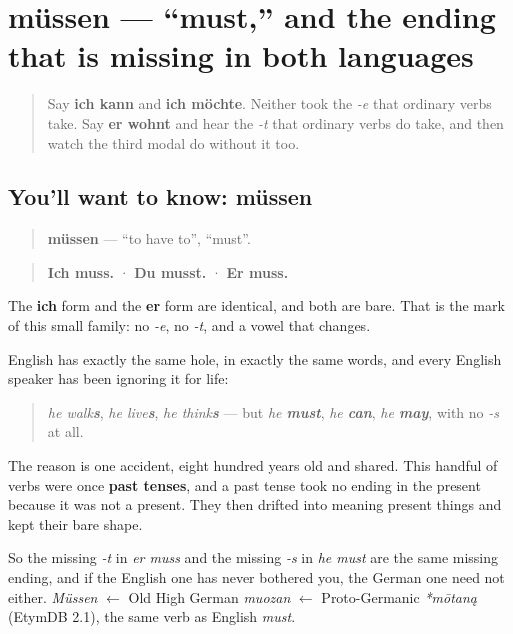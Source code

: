 \section[müssen]{müssen — \textquotedblleft{}must,\textquotedblright{} and the ending that is missing in both languages}

\label{lesson:GE-C38-muessen}



\begin{quote}
Say \textbf{ich kann} and \textbf{ich möchte}. Neither took the \emph{-e} that ordinary verbs take. Say \textbf{er wohnt} and hear the \emph{-t} that ordinary verbs do take, and then watch the third modal do without it too.
\end{quote}

\subsection*{You'll want to know: müssen}
\begin{quote}
\textbf{müssen} — \textquotedblleft{}to have to\textquotedblright{}, \textquotedblleft{}must\textquotedblright{}.
\end{quote}

\begin{quote}
\textbf{Ich muss.} · \textbf{Du musst.} · \textbf{Er muss.}
\end{quote}

The \textbf{ich} form and the \textbf{er} form are identical, and both are bare. That is the mark of this small family: no \emph{-e}, no \emph{-t}, and a vowel that changes.

\begin{cousinweb}
English has exactly the same hole, in exactly the same words, and every English speaker has been ignoring it for life:

\begin{quote}
\emph{he walk\textbf{s}}, \emph{he live\textbf{s}}, \emph{he think\textbf{s}} — but \emph{he \textbf{must}}, \emph{he \textbf{can}}, \emph{he \textbf{may}}, with no \emph{-s} at all.
\end{quote}

The reason is one accident, eight hundred years old and shared. This handful of verbs were once \textbf{past tenses}, and a past tense took no ending in the present because it was not a present. They then drifted into meaning present things and kept their bare shape.

So the missing \emph{-t} in \emph{er muss} and the missing \emph{-s} in \emph{he must} are the same missing ending, and if the English one has never bothered you, the German one need not either. \emph{Müssen} $\leftarrow$ Old High German \emph{muozan} $\leftarrow$ Proto-Germanic \emph{*mōtaną} (EtymDB 2.1), the same verb as English \emph{must}.
\end{cousinweb}

